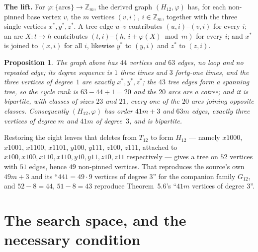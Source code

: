 \documentclass[11pt]{amsart}
\newtheorem{proposition}[theorem]{Proposition}
\theoremstyle{remark}
\begin{document}
\medskip
\noindent\textbf{The lift.} For $\varphi\colon\{\text{arcs}\}\to\mathbb{Z}_m$, the derived graph
$(H_{12},\varphi)$ has, for each non-pinned base vertex $v$, the $m$ vertices $(v,i)$,
$i\in\mathbb{Z}_m$, together with the three single vertices $x^{*},y^{*},z^{*}$. A tree edge
$u$--$v$ contributes $(u,i)$--$(v,i)$ for every $i$; an arc $X\colon t\to h$ contributes
$(t,i)$--$(h,\,i+\varphi(X)\bmod m)$ for every $i$; and $x^{*}$ is joined to $(x,i)$ for all
$i$, likewise $y^{*}$ to $(y,i)$ and $z^{*}$ to $(z,i)$.

\begin{proposition}\label{prop:base}
The graph above has $44$ vertices and $63$ edges, no loop and no repeated edge; its degree
sequence is $1$ three times and $3$ forty-one times, and the three vertices of degree~$1$ are
exactly $x^{*},y^{*},z^{*}$; the $43$ tree edges form a spanning tree, so the cycle rank is
$63-44+1=20$ and the $20$ arcs are a cotree; and it is bipartite, with classes of sizes $23$
and $21$, every one of the $20$ arcs joining opposite classes. Consequently $(H_{12},\varphi)$
has order $41m+3$ and $63m$ edges, exactly three vertices of degree $m$ and $41m$ of
degree~$3$, and is bipartite.
\end{proposition}

Restoring the eight leaves that \cite[p.~27]{AAB} deletes from $T_{12}$ to form $H_{12}$ ---
namely $x1000$, $x1001$, $x1100$, $x1101$, $y100$, $y111$, $z100$, $z111$, attached to
$x100,x100,x110,x110,y10,y11,z10,z11$ respectively --- gives a tree on $52$ vertices with $51$
edges, hence $49$ non-pinned vertices. That reproduces the source's own $49m+3$ and its
``$441=49\cdot 9$ vertices of degree 3'' for the companion family $G_{12}$, and $52-8=44$,
$51-8=43$ reproduce Theorem~5.6's ``$41m$ vertices of degree 3''.

\section{The search space, and the necessary condition}\label{sec:space}
\end{document}
